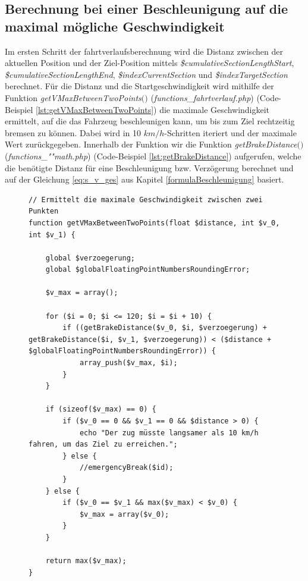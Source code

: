 \subsection{Berechnung bei einer Beschleunigung auf die maximal mögliche Geschwindigkeit} \label{v_max}
Im ersten Schritt der \Gls{fahrtverlauf}sberechnung wird die Distanz zwischen der aktuellen Position und der Ziel-Position mittels \textit{\$cumulativeSectionLengthStart}, \textit{\$cumulativeSectionLengthEnd}, \textit{\$indexCurrentSection} und \textit{\$indexTargetSection} berechnet. Für die Distanz und die Startgeschwindigkeit wird mithilfe der Funktion \textit{get\-V\-Max\-Be\-tween\-Two\-Points$($$)$} (\textit{func\-tions\_fahrt\-ver\-lauf.php}) (Code-Beispiel \ref{lst:getVMaxBetweenTwoPoints}) die maximale Geschwindigkeit ermittelt, auf die das Fahrzeug beschleunigen kann, um bis zum Ziel rechtzeitig bremsen zu können. Dabei wird in 10 $km/h$-Schritten iteriert und der maximale Wert zurückgegeben. Innerhalb der Funktion wir die Funktion \textit{getBrakeDistance$($$)$} (\textit{func\-tions\_""math.php}) (Code-Beispiel \ref{lst:getBrakeDistance}) aufgerufen, welche die benötigte Distanz für eine Beschleunigung bzw. Verzögerung berechnet und auf der Gleichung \ref{eq:s_v_ges} aus Kapitel \ref{formulaBeschleunigung} basiert.
\begin{figure}
\begin{lstlisting}[caption={\textit{getVMaxBetweenTwoPoints$($$)$} (\textit{functions\_fahrtverlauf.php})},captionpos=b,label={lst:getVMaxBetweenTwoPoints}]
// Ermittelt die maximale Geschwindigkeit zwischen zwei Punkten
function getVMaxBetweenTwoPoints(float $distance, int $v_0, int $v_1) {

	global $verzoegerung;
	global $globalFloatingPointNumbersRoundingError;

	$v_max = array();

	for ($i = 0; $i <= 120; $i = $i + 10) {
		if ((getBrakeDistance($v_0, $i, $verzoegerung) + getBrakeDistance($i, $v_1, $verzoegerung)) < ($distance + $globalFloatingPointNumbersRoundingError)) {
			array_push($v_max, $i);
		}
	}

	if (sizeof($v_max) == 0) {
		if ($v_0 == 0 && $v_1 == 0 && $distance > 0) {
			echo "Der zug müsste langsamer als 10 km/h fahren, um das Ziel zu erreichen.";
		} else {
			//emergencyBreak($id);
		}
	} else {
		if ($v_0 == $v_1 && max($v_max) < $v_0) {
			$v_max = array($v_0);
		}
	}

	return max($v_max);
}
\end{lstlisting}
\end{figure}

